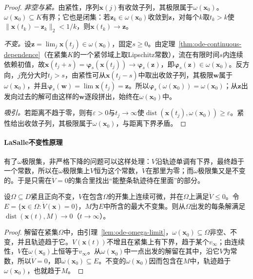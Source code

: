 \begin{proof}
  \emph{非空与紧。}由紧性，序列$\bm x(j)$有收敛子列，其极限属于$\omega(\bm x_0)$。$\omega(\bm x_0)\subseteq K$有界；它也是闭集：若$\bm z_k\in\omega(\bm x_0)$收敛到$\bm z$，对每个$k$取$t_k>k$使$\|\bm x(t_k)-\bm z_k\|_2<1/k$，则$\bm x(t_k)\to\bm z$。

  \emph{不变。}设$\bm z=\lim_j\bm x(t_j)\in\omega(\bm x_0)$，固定$s\geq0$。由定理~\ref{thm:ode-continuous-dependence}（在紧集$K$的一个紧邻域上取Lipschitz常数），流在有限时间$s$内连续依赖初值，故$\bm x(t_j+s)=\bm\varphi_s(\bm x(t_j))\to\bm\varphi_s(\bm z)$，即$\bm\varphi_s(\bm z)\in\omega(\bm x_0)$。反方向，$j$充分大时$t_j>s$，由紧性可从$\bm x(t_j-s)$中取出收敛子列，其极限$\bm w$属于$\omega(\bm x_0)$，并且$\bm\varphi_s(\bm w)=\lim\bm x(t_j)=\bm z$。所以$\bm\varphi_s(\omega(\bm x_0))=\omega(\bm x_0)$；从$\bm z$出发向过去的解可由这样的$\bm w$逐段拼出，始终在$\omega(\bm x_0)$中。

  \emph{吸引。}若距离不趋于零，则有$\varepsilon>0$与$t_j\to\infty$使$\operatorname{dist}(\bm x(t_j),\omega(\bm x_0))\geq\varepsilon$。紧性给出收敛子列，其极限属于$\omega(\bm x_0)$，与距离下界矛盾。
\end{proof}

\paragraph{LaSalle不变性原理}
有了$\omega$极限集，非严格下降的问题可以这样处理：$V$沿轨迹单调有下界，最终趋于一个常数，所以在$\omega$极限集上$V$恒为这个常数，$\dot V$在那里为零；而$\omega$极限集又是不变的。于是只需在$\dot V=0$的集合里找出“能整条轨迹待在里面”的部分。

\begin{theorem}[LaSalle不变性原理]
  \label{thm:ode-lasalle}
  设$\Omega\subseteq D$紧且正向不变，$V$在包含$\Omega$的开集上连续可微，并在$\Omega$上满足$\dot V\leq0$。令$E=\{\bm x\in\Omega:\dot V(\bm x)=0\}$，$M$为$E$中所含的最大不变集。则从$\Omega$出发的每条解满足$\operatorname{dist}(\bm x(t),M)\to0$（$t\to\infty$）。
\end{theorem}

\begin{proof}
  解留在紧集$\Omega$中，由引理~\ref{lem:ode-omega-limit}，$\omega(\bm x_0)\subseteq\Omega$非空、不变，并且轨迹趋于它。$V(\bm x(t))$不增且在紧集上有下界，趋于某个$v_\infty$；由连续性，$V$在$\omega(\bm x_0)$上恒等于$v_\infty$。从$\omega(\bm x_0)$中一点出发的解留在其中，沿它$V$为常数，所以$\dot V=0$，即$\omega(\bm x_0)\subseteq E$。不变的$\omega(\bm x_0)$因而包含在$M$中，轨迹趋于$\omega(\bm x_0)$，也就趋于$M$。
\end{proof}

